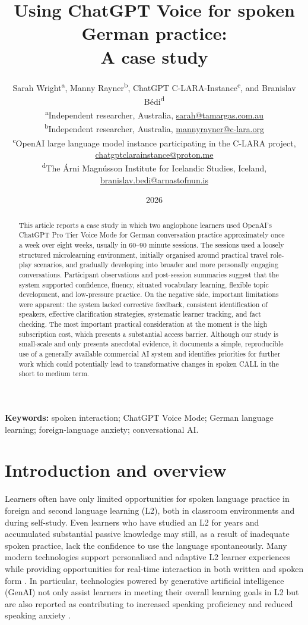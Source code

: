 \documentclass[11pt,a4paper]{article}
\title{Using ChatGPT Voice for spoken German practice:\\A case study}
\author{%
  \parbox{0.96\textwidth}{\centering
    Sarah Wright\textsuperscript{a}, Manny Rayner\textsuperscript{b},
    ChatGPT C-LARA-Instance\textsuperscript{c}, and Branislav B\'{e}di\textsuperscript{d}\\[0.6em]
    \small \textsuperscript{a}Independent researcher, Australia,
    \href{mailto:sarah@tamargas.com.au}{sarah@tamargas.com.au}\\
    \small \textsuperscript{b}Independent researcher, Australia,
    \href{mailto:mannyrayner@c-lara.org}{mannyrayner@c-lara.org}\\
    \small \textsuperscript{c}OpenAI large language model instance participating in the C-LARA project,
    \href{mailto:chatgptclarainstance@proton.me}{chatgptclarainstance@proton.me}\\
    \small \textsuperscript{d}The \'{A}rni Magn\'{u}sson Institute for Icelandic Studies, Iceland,
    \href{mailto:branislav.bedi@arnastofnun.is}{branislav.bedi@arnastofnun.is}
  }%
}
\date{2026}
\begin{document}
\maketitle

\begin{abstract}
This article reports a case study in which two anglophone learners used OpenAI's ChatGPT Pro Tier Voice Mode for German conversation practice approximately once a week over eight weeks, usually in 60--90 minute sessions. The sessions used a loosely structured microlearning environment, initially organised around practical travel role-play scenarios, and gradually developing into broader and more personally engaging conversations. Participant observations and post-session summaries suggest that the system supported confidence, fluency, situated vocabulary learning, flexible topic development, and low-pressure practice. On the negative side, important limitations were apparent: the system lacked corrective feedback, consistent identification of speakers, effective clarification strategies, systematic learner tracking, and fact checking. The most important practical consideration at the moment is the high subscription cost, which presents a substantial access barrier. Although our study is small-scale and only presents anecdotal evidence, it documents a simple, reproducible use of a generally available commercial AI system and identifies priorities for further work which could potentially lead to transformative changes in spoken CALL in the short to medium term.
\end{abstract}

\noindent\textbf{Keywords:} spoken interaction; ChatGPT Voice Mode; German language learning; foreign-language anxiety; conversational AI.

\section{Introduction and overview}

Learners often have only limited opportunities for spoken language practice in foreign and second language learning (L2), both in classroom environments and during self-study. Even learners who have studied an L2 for years and accumulated substantial passive knowledge may still, as a result of inadequate spoken practice, lack the confidence to use the language spontaneously. Many modern technologies support personalised and adaptive L2 learner experiences while providing opportunities for real-time interaction in both written and spoken form \citep{Urbaite2024}. In particular, technologies powered by generative artificial intelligence (GenAI) not only assist learners in meeting their overall learning goals in L2 but are also reported as contributing to increased speaking proficiency and reduced speaking anxiety \citep{DuDaniel2024,MengZou2026,SaarelaEtAl2026}.
\end{document}
